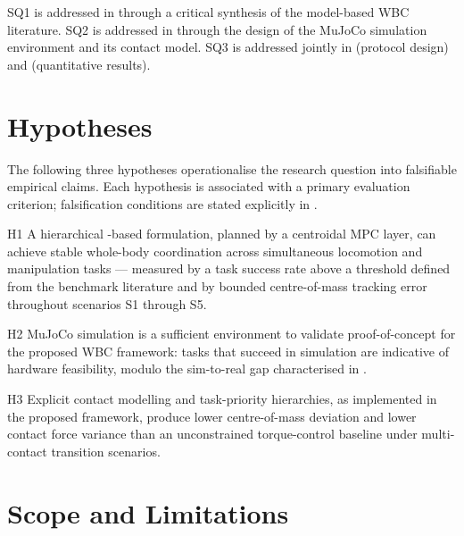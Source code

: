 \noindent SQ1 is addressed in  through a critical
synthesis of the model-based WBC literature. SQ2 is addressed in
 through the design of the MuJoCo simulation
environment and its contact model. SQ3 is addressed jointly in
 (protocol design) and 
(quantitative results).


\section{Hypotheses}
\label{sec:hypotheses}

The following three hypotheses operationalise the research question into
falsifiable empirical claims. Each hypothesis is associated with a
primary evaluation criterion; falsification conditions are stated
explicitly in .

\begin{hypothesis}{H1}
  A hierarchical \QP{}-based \WBC{} formulation, planned by a centroidal
  MPC layer, can achieve stable whole-body coordination across
  simultaneous locomotion and manipulation tasks — measured by a task
  success rate above a threshold defined from the benchmark literature
  and by bounded centre-of-mass tracking error throughout scenarios S1
  through S5.
\end{hypothesis}

\begin{hypothesis}{H2}
  MuJoCo simulation is a sufficient environment to validate
  proof-of-concept for the proposed WBC framework: tasks that succeed in
  simulation are indicative of hardware feasibility, modulo the
  sim-to-real gap characterised in .
\end{hypothesis}

\begin{hypothesis}{H3}
  Explicit contact modelling and task-priority hierarchies, as
  implemented in the proposed framework, produce lower centre-of-mass
  deviation and lower contact force variance than an unconstrained
  torque-control baseline under multi-contact transition scenarios.
\end{hypothesis}


\section{Scope and Limitations}
\label{sec:scope}

